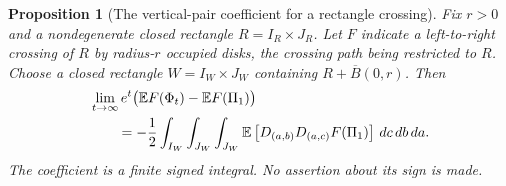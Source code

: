 \documentclass[11pt,a4paper]{article}
\newtheorem{proposition}[theorem]{Proposition}
\theoremstyle{definition}
\theoremstyle{remark}
\numberwithin{equation}{section}
\begin{document}
\begin{proposition}[The vertical-pair coefficient for a rectangle crossing]
\label{ell:vertical-coefficient}
Fix $r>0$ and a nondegenerate closed rectangle
$R=I_R\times J_R$.  Let $F$ indicate a left-to-right crossing
of $R$ by radius-$r$ occupied disks, the crossing path being
restricted to $R$.  Choose a closed rectangle
$W=I_W\times J_W$ containing
$R+\overline B(0,r)$.  Then
\begin{align}
 &\lim_{t\to\infty}e^t
       \bigl(\mathbb EF(\Phi_t)-\mathbb EF(\Pi_1)\bigr)
 \notag\\
 &\qquad=-\frac12\int_{I_W}\int_{J_W}\int_{J_W}
       \mathbb E\left[D_{(a,b)}D_{(a,c)}F(\Pi_1)\right]
                  \,dc\,db\,da.\label{ell:vertical-limit}
\end{align}
The coefficient is a finite signed integral.  No assertion about
its sign is made.
\end{proposition}
\end{document}

